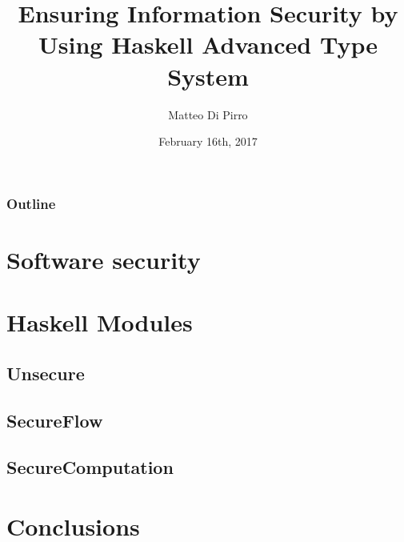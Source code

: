 \documentclass{beamer}
\title{Ensuring Information Security \newline by Using Haskell Advanced Type System}
\subtitle{}
\author{Matteo Di Pirro}
\date{February 16th, 2017}
\institute{University of Padova}
\begin{document}
\newcommand{\turnOffNumbers}{true} %

\begin{frame}[noframenumbering]
\titlepage
\end{frame}

\let\turnOffNumbers\empty
\begin{frame}
	\frametitle{Outline}
	\tableofcontents
\end{frame}

\section{Software security}



\section{Haskell Modules}
	\subsection{Unsecure}
	
	\subsection{SecureFlow}
	
	
	\subsection{SecureComputation}
	
	
\section{Conclusions}

	
\appendix
\makethanks
\renewcommand{\turnOffNumbers}{true} %
\end{document}
